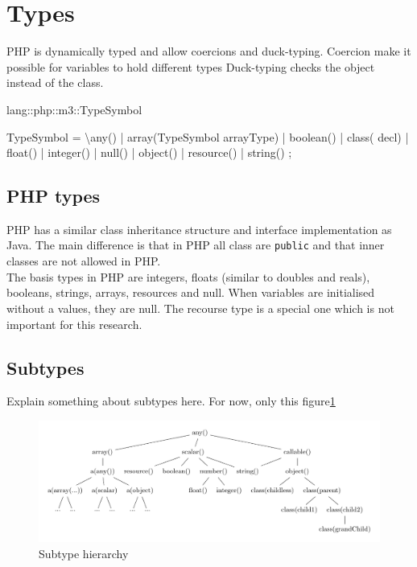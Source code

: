 \documentclass[../main.tex]{subfiles}
\begin{document}
    \section{Types}\label{sec:types}
    PHP is dynamically typed and allow coercions and duck-typing.
    Coercion make it possible for variables to hold different types
    Duck-typing checks the object instead of the class.
    
    \begin{rascal}
 lang::php::m3::TypeSymbol

 TypeSymbol
  = \textbackslash{}any()        | array(TypeSymbol arrayType)
  | boolean()     | class( decl)
  | float()       | integer()
  | null()        | object()
  | resource()    | string()
  ;
    \end{rascal}
    
    \subsection{PHP types}
    PHP has a similar class inheritance structure and interface implementation as Java.
    The main difference is that in PHP all class are \texttt{public} and that inner classes are not allowed in PHP. 
    \\
    The basis types in PHP are integers, floats (similar to doubles and reals), booleans, strings, arrays, resources and null.
    When variables are initialised without a values, they are null. The recourse type is a special one which is not important for this research.
 
    \subsection{Subtypes}
    
    Explain something about subtypes here. For now, only this figure\ref{fig:subtypeTree}

    \begin{figure}[H]
        \includegraphics{Diagrams/Subtypes.pdf}
        \caption{Subtype hierarchy}
        \label{fig:subtypeTree}
    \end{figure}
\end{document}
